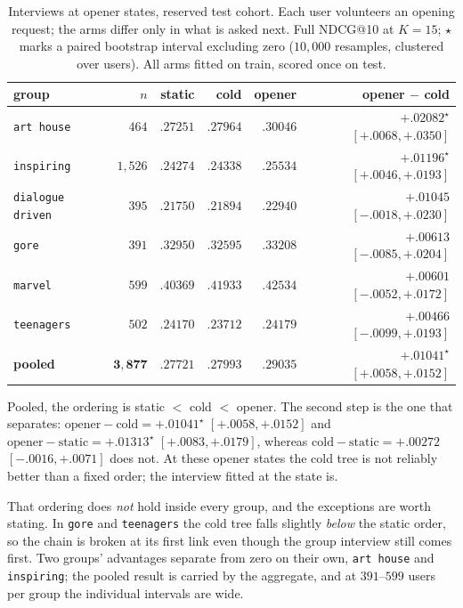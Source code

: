 \documentclass[11pt]{article}
\begin{document}
\begin{table}[t]
\centering
\caption{Interviews at opener states, reserved test cohort. Each user volunteers an opening request; the
arms differ only in what is asked next. Full NDCG@10 at $K{=}15$; $\star$ marks a paired bootstrap interval
excluding zero ($10{,}000$ resamples, clustered over users). All arms fitted on train, scored once on test.}
\label{tab:volunteered}
\footnotesize
\begin{tabular}{lr rrr r}
\toprule
group & $n$ & static & cold & opener & opener $-$ cold \\
\midrule
\texttt{art house} & $464$ & $.27251$ & $.27964$ & $\mathbf{.30046}$ & $+.02082^\star$ $[+.0068,+.0350]$ \\
\texttt{inspiring} & $1{,}526$ & $.24274$ & $.24338$ & $\mathbf{.25534}$ & $+.01196^\star$ $[+.0046,+.0193]$ \\
\texttt{dialogue driven} & $395$ & $.21750$ & $.21894$ & $\mathbf{.22940}$ & $+.01045$ $[-.0018,+.0230]$ \\
\texttt{gore} & $391$ & $.32950$ & $.32595$ & $\mathbf{.33208}$ & $+.00613$ $[-.0085,+.0204]$ \\
\texttt{marvel} & $599$ & $.40369$ & $.41933$ & $\mathbf{.42534}$ & $+.00601$ $[-.0052,+.0172]$ \\
\texttt{teenagers} & $502$ & $.24170$ & $.23712$ & $\mathbf{.24179}$ & $+.00466$ $[-.0099,+.0193]$ \\
\midrule
\textbf{pooled} & $\mathbf{3{,}877}$ & $.27721$ & $.27993$ & $\mathbf{.29035}$ & $\mathbf{+.01041^\star}$ $[+.0058,+.0152]$ \\
\bottomrule
\end{tabular}
\end{table}

Pooled, the ordering is static $<$ cold $<$ opener. The second step is the one that separates:
$\text{opener}-\text{cold}=+.01041^\star$ $[+.0058,+.0152]$ and
$\text{opener}-\text{static}=+.01313^\star$ $[+.0083,+.0179]$, whereas
$\text{cold}-\text{static}=+.00272$ $[-.0016,+.0071]$ does not. At these opener states the cold tree is
not reliably better than a fixed order; the interview fitted at the state is.

That ordering does \emph{not} hold inside every group, and the exceptions are worth stating. In
\texttt{gore} and \texttt{teenagers} the cold tree falls slightly \emph{below} the static order, so the
chain is broken at its first link even though the group interview still comes first. Two groups'
advantages separate from zero on their own, \texttt{art house} and \texttt{inspiring}; the pooled result
is carried by the aggregate, and at $391$--$599$ users per group the individual intervals are wide.
\end{document}
